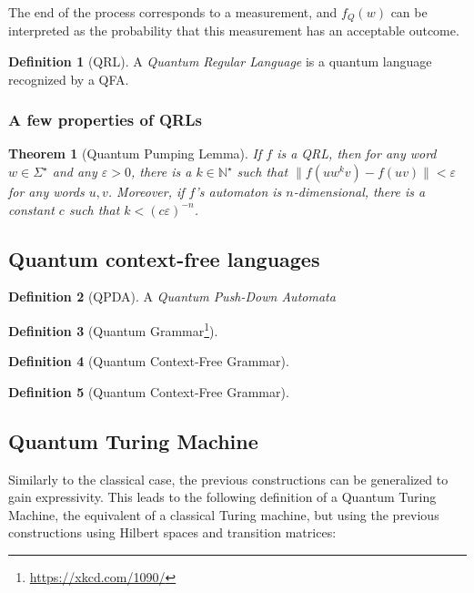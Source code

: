 \documentclass[12pt,a4paper]{article}
\newtheorem*{theorem}{Theorem}
\theoremstyle{definition}
\newtheorem*{definition}{Definition}
\begin{document}
The end of the process corresponds to a measurement, and $f_Q(w)$ can be interpreted as the probability that this measurement has an acceptable outcome. 

\begin{definition}[QRL]
    A \emph{Quantum Regular Language} is a quantum language recognized by a QFA.
\end{definition}

\subsubsection{A few properties of QRLs}
\begin{theorem}[Quantum Pumping Lemma]
    If $f$ is a QRL, then for any word $w\in\Sigma^\star$ and any $\varepsilon > 0$, there is a $k\in \mathbb{N}^\star$ such that $\|f(uw^kv) - f(uv)\| < \varepsilon$ for any words $u, v$. Moreover, if $f$'s automaton is $n$-dimensional, there is a constant $c$ such that $k < (c\varepsilon)^{-n}$.
\end{theorem}

\subsection{Quantum context-free languages}
\begin{definition}[QPDA]
    A \emph{Quantum Push-Down Automata}
\end{definition}

\begin{definition}[Quantum Grammar\footnote{\url{https://xkcd.com/1090/}}]
    
\end{definition}

\begin{definition}[Quantum Context-Free Grammar]
    
\end{definition}

\begin{definition}[Quantum Context-Free Grammar]
    
\end{definition}

\subsection{Quantum Turing Machine}
Similarly to the classical case, the previous constructions can be generalized to gain expressivity. This leads to the following definition of a Quantum Turing Machine, the equivalent of a classical Turing machine, but using the previous constructions using Hilbert spaces and transition matrices:
\end{document}
